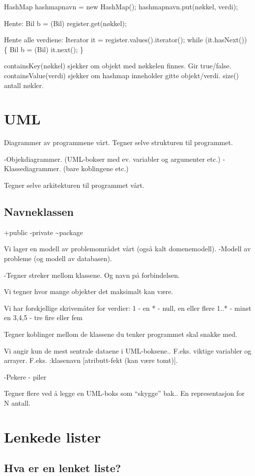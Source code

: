 \documentclass[a4paper,norsk,10pt]{article}
\begin{document}
HashMap hashmapnavn = new HashMap();
hashmapnavn.put(nøkkel, verdi);

Hente: Bil b = (Bil) register.get(nøkkel);

Hente alle verdiene:
Iterator it = register.values().iterator();
while (it.hasNext()) \{
    Bil b = (Bil) it.next();
\}


containsKey(nøkkel) sjekker om objekt med nøkkelen finnes. Gir
true/false.
containsValue(verdi) sjekker om hashmap inneholder gitte objekt/verdi.
size() antall nøkler.
\section{UML}
\label{sec-7}


Diagrammer av programmene vårt.
Tegner selve strukturen til programmet.

-Objekdiagrammer. (UML-bokser med ev. variabler og argumenter etc.)
-Klassediagrammer. (bare koblingene etc.)

Tegner selve arkitekturen til programmet vårt. 
\subsection{Navneklassen}
\label{sec-7.1}


+public
-private
\~{}package

Vi lager en modell av problemområdet vårt (også kalt domenemodell).
-Modell av probleme (og modell av databasen).

-Tegner streker mellom klassene. Og navn på forbindelsen.

Vi tegner hvor mange objekter det maksimalt kan være.

Vi har forskjellige skrivemåter for verdier:
1 - en
 * -  null, en eller flere
1..* - minst en
3,4,5 - tre fire eller fem

Tegner koblinger mellom de klassene du tenker programmet skal snakke
med.

Vi angir kun de mest sentrale dataene i UML-boksene.. F.eks. viktige
variabler og arrayer.
F.eks. :klasenavn [atributt-fekt (kan være tomt)].

-Pekere - piler

Tegner flere ved å legge en UML-boks som ``skygge'' bak.. En
representasjon for N antall.
\section{Lenkede lister}
\label{sec-8}
\subsection{Hva er en lenket liste?}
\label{sec-8.1}
\end{document}
